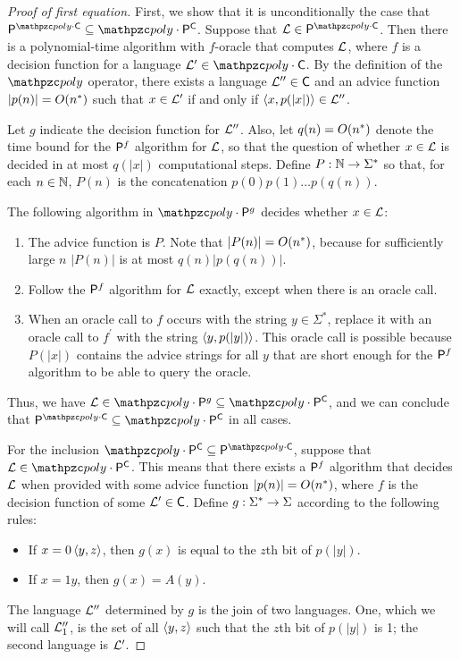 \begin{proof}[Proof of first equation]
First, we show that it is unconditionally the case that
$\sP^{\cpoly\cdot\sC}\subseteq\cpoly\cdot\sP^\sC$. Suppose that
$\cL\in\sP^{\cpoly\cdot\sC}$. Then there is a polynomial-time algorithm with
$f$-oracle that computes $\mathcal{L}$, where $f$ is a decision function for a language
$\cL^\prime\in\cpoly\cdot\sC$. By the definition of the $\cpoly$ operator, there
exists a language $\mathcal{L}^{\prime\prime}\in\mathsf{C}$ and an advice function
$|p(n)|=O(n^*)$ such that $x\in\mathcal{L}^\prime$ if and only if
$\left\langle x,p(|x|)\right\rangle\in\mathcal{L}^{\prime\prime}$.

Let $g$ indicate the decision function for $\mathcal{L}^{\prime\prime}$. Also,
let $q(n)=O(n^*)$ denote the time bound for the $\mathsf{P}^f$ algorithm for $\mathcal{L}$, so
that the question of whether $x\in\mathcal{L}$ is decided in at most $q(|x|)$
computational steps. Define $P:\mathbb{N}\rightarrow\Sigma^*$ so that, for each
$n\in\mathbb{N}$, $P(n)$ is the concatenation $p(0)p(1)\ldots p(q(n))$.

The following algorithm in $\cpoly\cdot\sP^{g}$ decides whether $x\in\mathcal{L}$:
\begin{enumerate}
\item The advice function is $P$. Note that $|P(n)|=O(n^*)$, because for
  sufficiently large $n$ $|P(n)|$ is at most $q(n)|p(q(n))|$.
\item Follow the $\mathsf{P}^f$ algorithm for $\mathcal{L}$ exactly, except when there is an
  oracle call.
\item When an oracle call to $f$ occurs with the string $y\in\Sigma^*$, replace
  it with an oracle call to $f^\prime$ with the string $\left\langle y,p(|y|)\right\rangle$. This
  oracle call is possible because $P(|x|)$ contains the advice strings for all
  $y$ that are short enough for the $\mathsf{P}^f$ algorithm to be able to query the
  oracle.
\end{enumerate}
Thus, we have $\cL\in\cpoly\cdot\sP^{g}\subseteq\cpoly\cdot\sP^\sC$, and we
can conclude that $\sP^{\cpoly\cdot\sC}\subseteq\cpoly\cdot\sP^\sC$ in all cases.

For the inclusion $\cpoly\cdot\sP^\sC\subseteq\sP^{\cpoly\cdot\sC}$, suppose that
$\cL\in\cpoly\cdot\sP^\sC$. This means that there exists a $\mathsf{P}^f$ algorithm that
decides $\mathcal{L}$ when provided with some advice function $|p(n)|=O(n^*)$, where
$f$ is the decision function of some $\mathcal{L}^\prime\in\mathsf{C}$. 
Define $g:\Sigma^*\rightarrow\Sigma$ according to the following rules:
\begin{itemize}
\item If $x=0\left\langle y,z\right\rangle$, then $g(x)$ is equal to the $z$th bit of
  $p(|y|)$.
\item If $x=1y$, then $g(x)=A(y)$.
\end{itemize}
The language $\mathcal{L}^{\prime\prime}$ determined by $g$ is the join of two
languages. One, which we will call $\mathcal{L}_1^{\prime\prime}$, is the set of all
$\left\langle y,z\right\rangle$ such that the $z$th bit of $p(|y|)$ is 1; the second language is
$\mathcal{L}^\prime$.


\end{proof}
